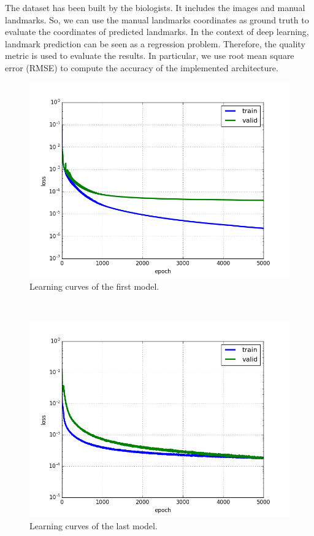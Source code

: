 \documentclass[review]{elsarticle}
\begin{document}
The dataset has been built by the biologists. It includes the images and manual landmarks. So, we can use the manual landmarks coordinates as ground truth to evaluate the coordinates of predicted landmarks. In the context of deep learning, landmark prediction can be seen as a regression problem. Therefore, the quality metric is used to evaluate the results. In particular, we use root mean square error (RMSE) to compute the accuracy of the implemented architecture. 
\begin{figure}[h!]
	\centerline{\includegraphics[scale=0.45]{images/loss_model_1}}
	\caption{Learning curves of the first model.}
	\label{figloss1}
\end{figure}~\\
\begin{figure}[h!]
	\centerline{\includegraphics[scale=0.45]{images/loss_v16}}
	\caption{Learning curves of the last model.}
	\label{figloss}
\end{figure}~\\[0.1cm]
\end{document}
